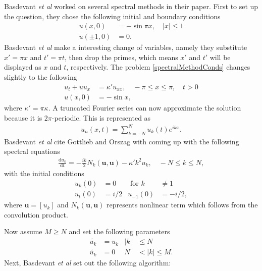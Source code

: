 \documentclass[undefended]{sfuthesis}
\begin{document}
Basdevant \textit{et al} \cite{burgerSpectral} worked on several spectral methods in their paper. First to set up the question, they chose the following initial and boundary conditions
\begin{subequations}
	\label{spectralMethodConds}
	\begin{align}
	u(x, 0) &= -\sin \pi x, \quad |x| \leq 1 \label{initialCond4} \\
	u(\pm 1, 0) &= 0 \label{boundConds4}.
	\end{align}
\end{subequations}
Basdevant \textit{et al} make a interesting change of variables, namely they substitute $x' = \pi x$ and $t' = \pi t$, then drop the primes, which means $x'$ and $t'$ will be displayed as $x$ and $t$, respectively. The problem \eqref{spectralMethodConds} changes slightly to the following
\begin{align*}
u_t + uu_x &= \kappa' u_{xx}, \quad -\pi \leq x \leq \pi, \quad t >0 \\
u(x, 0) &= - \sin x,
\end{align*}
where $\kappa' = \pi \kappa.$ A truncated Fourier series can now approximate the solution because it is $2\pi$-periodic. This is represented as 
\begin{align*}
u_n(x, t) = \sum_{k = - N}^{N} u_k(t)e^{ikx}.
\end{align*} 
Basdevant \textit{et al} cite Gottlieb and Orszag \cite{spectralMethod} with coming up with the following spectral equations
\begin{align}
\frac{\mathrm{d} u_k}{\mathrm{d} t} = -\frac{ik}{2} N_k(\textbf{u}, \textbf{u}) - \kappa'k^2 u_k, \quad -N \leq k \leq N, \label{spectralMethod1}
\end{align}
with the initial conditions
\begin{align*}
u_k(0) &= 0 &\text{ for } k & \neq 1 \\
u_t(0) &= i/2 & u_{-1}(0) &= -i/2,
\end{align*}
where $\textbf{u} = [u_k]$ and $N_k(\textbf{u}, \textbf{u})$ represents nonlinear term which follows from the convolution product.

Now assume $M \geq N$ and set the following parameters
\begin{align*}
\widetilde{u_k} & = u_k & |k| &\leq N \\
\widetilde{u_k} & = 0 & N & < |k| \leq M.
\end{align*}
Next, Basdevant \textit{et al} set out the following algorithm:
\end{document}
